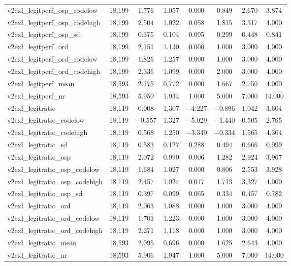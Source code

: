 \begin{table}[!htbp]
\begin{tabular}{@{\extracolsep{5pt}}lccccccc}
v2exl\_legitperf\_osp\_codelow & 18,199 & 1.776 & 1.057 & 0.000 & 0.849 & 2.670 & 3.874 \\ 
v2exl\_legitperf\_osp\_codehigh & 18,199 & 2.504 & 1.022 & 0.058 & 1.815 & 3.317 & 4.000 \\ 
v2exl\_legitperf\_osp\_sd & 18,199 & 0.375 & 0.104 & 0.095 & 0.299 & 0.448 & 0.841 \\ 
v2exl\_legitperf\_ord & 18,199 & 2.151 & 1.130 & 0.000 & 1.000 & 3.000 & 4.000 \\ 
v2exl\_legitperf\_ord\_codelow & 18,199 & 1.826 & 1.257 & 0.000 & 1.000 & 3.000 & 4.000 \\ 
v2exl\_legitperf\_ord\_codehigh & 18,199 & 2.336 & 1.099 & 0.000 & 2.000 & 3.000 & 4.000 \\ 
v2exl\_legitperf\_mean & 18,593 & 2.175 & 0.772 & 0.000 & 1.667 & 2.750 & 4.000 \\ 
v2exl\_legitperf\_nr & 18,593 & 5.950 & 1.934 & 1.000 & 5.000 & 7.000 & 14.000 \\ 
v2exl\_legitratio & 18,119 & 0.008 & 1.307 & $-$4.227 & $-$0.896 & 1.042 & 3.604 \\ 
v2exl\_legitratio\_codelow & 18,119 & $-$0.557 & 1.327 & $-$5.029 & $-$1.440 & 0.505 & 2.765 \\ 
v2exl\_legitratio\_codehigh & 18,119 & 0.568 & 1.250 & $-$3.340 & $-$0.334 & 1.565 & 4.304 \\ 
v2exl\_legitratio\_sd & 18,119 & 0.583 & 0.127 & 0.288 & 0.494 & 0.666 & 0.999 \\ 
v2exl\_legitratio\_osp & 18,119 & 2.072 & 0.990 & 0.006 & 1.282 & 2.924 & 3.967 \\ 
v2exl\_legitratio\_osp\_codelow & 18,119 & 1.684 & 1.027 & 0.000 & 0.806 & 2.553 & 3.928 \\ 
v2exl\_legitratio\_osp\_codehigh & 18,119 & 2.457 & 1.024 & 0.017 & 1.713 & 3.327 & 4.000 \\ 
v2exl\_legitratio\_osp\_sd & 18,119 & 0.397 & 0.099 & 0.065 & 0.334 & 0.457 & 0.782 \\ 
v2exl\_legitratio\_ord & 18,119 & 2.063 & 1.088 & 0.000 & 1.000 & 3.000 & 4.000 \\ 
v2exl\_legitratio\_ord\_codelow & 18,119 & 1.703 & 1.223 & 0.000 & 1.000 & 3.000 & 4.000 \\ 
v2exl\_legitratio\_ord\_codehigh & 18,119 & 2.271 & 1.118 & 0.000 & 1.000 & 3.000 & 4.000 \\ 
v2exl\_legitratio\_mean & 18,593 & 2.095 & 0.696 & 0.000 & 1.625 & 2.643 & 4.000 \\ 
v2exl\_legitratio\_nr & 18,593 & 5.906 & 1.947 & 1.000 & 5.000 & 7.000 & 14.000 \\ 

\end{tabular}
\end{table}
